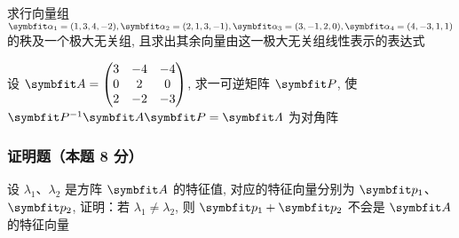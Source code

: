 \begin{ti}[12 分]
	求行向量组 $\balpha_{1} = (1,3,4,-2), \balpha_{2} = (2,1,3,-1), \balpha_{3} = (3,-1,2,0), \balpha_{4} = (4,-3,1,1)$ 的秩及一个极大无关组, 且求出其余向量由这一极大无关组线性表示的表达式
\end{ti}

\begin{ti}[13 分]
	设 $\bA = \begin{pmatrix}
		3 & -4 & -4 \\
		0 & 2 & 0 \\
		2 & -2 & -3
	\end{pmatrix}$, 求一可逆矩阵 $\symbfit P$, 使 $\symbfit P^{-1} \bA \symbfit P = \symbfit \varLambda$ 为对角阵
\end{ti}

\subsubsection{证明题（本题 8 分）}
设 $\lambda_{1}$、$\lambda_{2}$ 是方阵 $\bA$ 的特征值, 对应的特征向量分别为 $\symbfit p_{1}$、$\symbfit p_{2}$, 证明：若 $\lambda_{1} \ne \lambda_{2}$, 则 $\symbfit p_{1} + \symbfit p_{2}$ 不会是 $\bA$ 的特征向量

\newpage
\guanggao